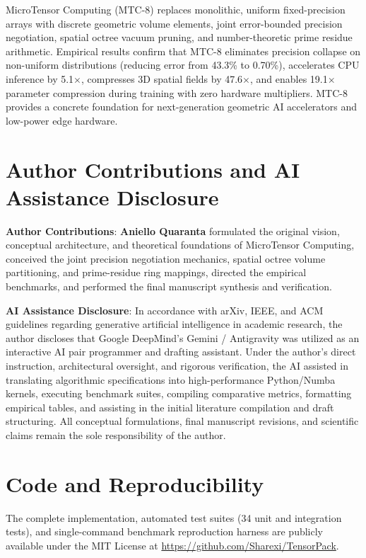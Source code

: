 \documentclass[11pt,a4paper]{article}
\begin{document}
MicroTensor Computing (MTC-8) replaces monolithic, uniform fixed-precision arrays with discrete geometric volume elements, joint error-bounded precision negotiation, spatial octree vacuum pruning, and number-theoretic prime residue arithmetic. Empirical results confirm that MTC-8 eliminates precision collapse on non-uniform distributions (reducing error from 43.3\% to 0.70\%), accelerates CPU inference by 5.1$\times$, compresses 3D spatial fields by 47.6$\times$, and enables 19.1$\times$ parameter compression during training with zero hardware multipliers. MTC-8 provides a concrete foundation for next-generation geometric AI accelerators and low-power edge hardware.

\section*{Author Contributions and AI Assistance Disclosure}

\textbf{Author Contributions}: \textbf{Aniello Quaranta} formulated the original vision, conceptual architecture, and theoretical foundations of MicroTensor Computing, conceived the joint precision negotiation mechanics, spatial octree volume partitioning, and prime-residue ring mappings, directed the empirical benchmarks, and performed the final manuscript synthesis and verification.

\textbf{AI Assistance Disclosure}: In accordance with arXiv, IEEE, and ACM guidelines regarding generative artificial intelligence in academic research, the author discloses that Google DeepMind's Gemini / Antigravity was utilized as an interactive AI pair programmer and drafting assistant. Under the author's direct instruction, architectural oversight, and rigorous verification, the AI assisted in translating algorithmic specifications into high-performance Python/Numba kernels, executing benchmark suites, compiling comparative metrics, formatting empirical tables, and assisting in the initial literature compilation and draft structuring. All conceptual formulations, final manuscript revisions, and scientific claims remain the sole responsibility of the author.

\section*{Code and Reproducibility}
The complete implementation, automated test suites (34 unit and integration tests), and single-command benchmark reproduction harness are publicly available under the MIT License at \url{https://github.com/Sharexi/TensorPack}.



\end{document}
